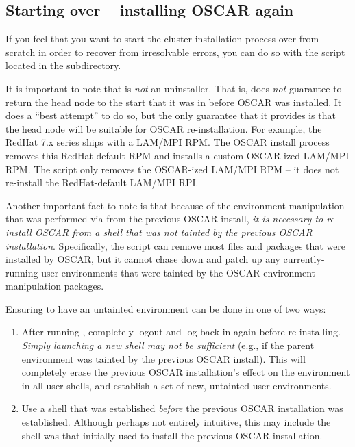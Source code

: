 
\subsection{Starting over -- installing OSCAR again}

If you feel that you want to start the cluster installation process
over from scratch in order to recover from irresolvable errors, you
can do so with the  script located in the
 subdirectory.

It is important to note that  is {\em not} an
uninstaller.  That is,  does {\em not} guarantee to
return the head node to the start that it was in before OSCAR was
installed.  It does a ``best attempt'' to do so, but the only
guarantee that it provides is that the head node will be suitable for
OSCAR re-installation.  For example, the RedHat 7.x series ships with
a LAM/MPI RPM.  The OSCAR install process removes this RedHat-default
RPM and installs a custom OSCAR-ized LAM/MPI RPM.  The
 script only removes the OSCAR-ized LAM/MPI RPM -- it
does not re-install the RedHat-default LAM/MPI RPI.

Another important fact to note is that because of the environment
manipulation that was performed via  from the previous
OSCAR install, {\em it is necessary to re-install OSCAR from a shell
  that was not tainted by the previous OSCAR installation}.
Specifically, the  script can remove most files and
packages that were installed by OSCAR, but it cannot chase down and
patch up any currently-running user environments that were tainted by
the OSCAR environment manipulation packages.

Ensuring to have an untainted environment can be done in one of two
ways:

\begin{enumerate}
\item After running , completely logout and log back
  in again before re-installing.  {\em Simply launching a new shell
    may not be sufficient} (e.g., if the parent environment was
  tainted by the previous OSCAR install).  This will completely erase
  the previous OSCAR installation's effect on the environment in all
  user shells, and establish a set of new, untainted user
  environments.
  
\item Use a shell that was established {\em before} the previous OSCAR
  installation was established.  Although perhaps not entirely
  intuitive, this may include the shell was that initially used to
  install the previous OSCAR installation.
\end{enumerate}

